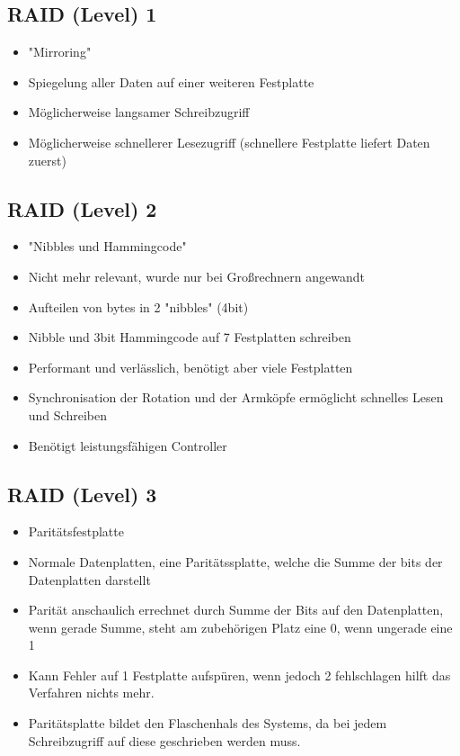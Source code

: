 \documentclass[a4paper]{scrreprt}
\begin{document}
\subsection{RAID (Level) 1}
\begin{itemize}
	\item "Mirroring"
	\item Spiegelung aller Daten auf einer weiteren Festplatte 
	\item Möglicherweise langsamer Schreibzugriff
	\item Möglicherweise schnellerer Lesezugriff (schnellere Festplatte liefert Daten zuerst)
	
\end{itemize}	
\subsection{RAID (Level) 2}
\begin{itemize}
	\item "Nibbles und Hammingcode"
	\item Nicht mehr relevant, wurde nur bei Großrechnern angewandt
	\item Aufteilen von bytes in 2 "nibbles" (4bit)
	\item Nibble und 3bit Hammingcode auf 7 Festplatten schreiben
	\item Performant und verlässlich, benötigt aber viele Festplatten
	\item Synchronisation der Rotation und der Armköpfe ermöglicht schnelles Lesen und Schreiben
	\item Benötigt leistungsfähigen Controller
\end{itemize}	
\subsection{RAID (Level) 3}
\begin{itemize}
	\item Paritätsfestplatte
	\item Normale Datenplatten, eine Paritätssplatte, welche die Summe der bits der Datenplatten darstellt
	\item Parität anschaulich errechnet durch Summe der Bits auf den Datenplatten, wenn gerade Summe, steht am zubehörigen Platz eine 0, wenn ungerade eine 1
	\item Kann Fehler auf 1 Festplatte aufspüren, wenn jedoch 2 fehlschlagen hilft das Verfahren nichts mehr.
	\item Paritätsplatte bildet den Flaschenhals des Systems, da bei jedem Schreibzugriff auf diese geschrieben werden muss.
\end{itemize}		
\end{document}
